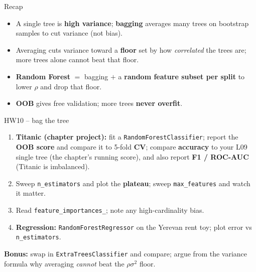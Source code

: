 \documentclass[aspectratio=169]{beamer}
\begin{document}
\begin{frame}{Recap}
  \begin{itemize}\small
    \item A single tree is \textbf{high variance}; \textbf{bagging} averages many trees on
      bootstrap samples to cut variance (not bias).
    \item Averaging cuts variance toward a \textbf{floor} set by how \emph{correlated} the
      trees are; more trees alone cannot beat that floor.
    \item \textbf{Random Forest} $=$ bagging $+$ a \textbf{random feature subset per split}
      to lower $\rho$ and drop that floor.
    \item \textbf{OOB} gives free validation; more trees \textbf{never overfit}.
  \end{itemize}
  \vfill
\end{frame}

\begin{frame}{HW10 -- bag the tree}
  \begin{enumerate}\small
    \item \textbf{Titanic (chapter project):} fit a \texttt{RandomForestClassifier}; report
      the \textbf{OOB score} and compare it to 5-fold \textbf{CV}; compare \textbf{accuracy}
      to your L09 single tree (the chapter's running score), and also report \textbf{F1 /
      ROC-AUC} (Titanic is imbalanced).
    \item Sweep \texttt{n\_estimators} and plot the \textbf{plateau}; sweep
      \texttt{max\_features} and watch it matter.
    \item Read \texttt{feature\_importances\_}; note any high-cardinality bias.
    \item \textbf{Regression:} \texttt{RandomForestRegressor} on the Yerevan rent toy; plot
      error vs \texttt{n\_estimators}.
  \end{enumerate}
  \vskip 2pt
  \textbf{Bonus:} swap in \texttt{ExtraTreesClassifier} and compare; argue from the variance
  formula why averaging \emph{cannot} beat the $\rho\sigma^2$ floor.
\end{frame}
\end{document}
